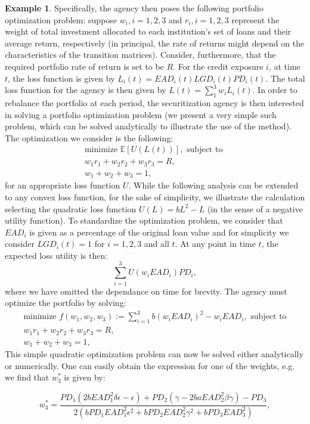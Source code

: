 \documentclass[11pt,reqno]{article}
\theoremstyle{definition}
\newtheorem{example}[theorem]{Example}
\begin{document}
\begin{example}
Specifically, the agency then poses the following portfolio optimization problem:	suppose $w_i, i=1,2,3$ and $r_i, i=1,2,3$ represent the weight of total investment allocated to each institution's set of loans and  their average return, respectively (in principal, the rate of returns might depend on the characteristics of the transition matrices). Consider, furthermore, that the required portfolio rate of return is set to be $R$. For the credit exposure $i$, at time $t$, the loss function is given by $L_i(t) = EAD_i(t)LGD_i(t)PD_i(t)$. The total loss function for the agency is then given by $L(t)= \sum_{1}^{3} w_iL_i(t)$. In order to rebalance the portfolio at each period, the securitization agency is then interested in solving a portfolio optimization problem (we present a very simple such problem, which can be solved analytically to illustrate the use of the method). The optimization we consider is the following: \\
\begin{eqnarray*}
	\text{minimize } \mathbb{E}[U(L(t))],  \text{ subject to }\\
	w_1 r_1 + w_2 r_2 + w_3 r_3 = R, \\
	w_1 +w_2 +w_3=1,
\end{eqnarray*} 
for an appropriate loss function $U$. While the following analysis can be extended to any convex loss function, for the sake of simplicity, we illustrate the calculation selecting the quadratic loss function $U(L)=bL^2-L$ (in the sense of a negative utility function). To standardize the optimization problem, we consider that $EAD_i$ is given as a percentage of the original loan value and for simplicity we consider $LGD_i(t) = 1$ for $i=1,2,3$ and all $t$. At any point in time $t$, the expected loss utility is then:
$$ \sum_{i=1}^{3} U(w_iEAD_i)PD_i,$$ where we have omitted the dependance on time for brevity. The agency must optimize the portfolio by solving: 
\begin{eqnarray*}
	\text{minimize } f(w_1,w_2,w_3):= \sum_{i=1}^{3} b(w_iEAD_i)^2-w_iEAD_i, \text{ subject to} \\
	w_1 r_1 + w_2 r_2 + w_3 r_3 = R, \\
	w_1 +w_2 +w_3=1,
\end{eqnarray*} 
This simple quadratic optimization problem can now be solved either analytically or numerically. One can easily obtain the expression for one of the weights, e.g. we find that $w_3^*$ is given by:

$$w_3^* =\frac{PD_1(2bEAD_1^2\delta\epsilon - \epsilon)+PD_2(\gamma-2baEAD_2^2\beta\gamma)-PD_3}{2(bPD_1EAD_1^2\epsilon^2+bPD_2EAD_2^2\gamma^2+bPD_3EAD_3^2)}, $$


\end{example}
\end{document}
